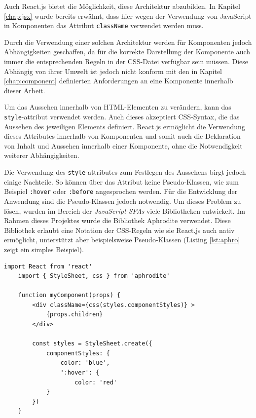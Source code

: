 Auch React.js bietet die Möglichkeit, diese Architektur abzubilden. In Kapitel \ref{chap:jsx} wurde bereits erwähnt, dass hier wegen der Verwendung von JavaScript in Komponenten das Attribut \texttt{className} verwendet werden muss.

Durch die Verwendung einer solchen Architektur werden für Komponenten jedoch Abhängigkeiten geschaffen, da für die korrekte Darstellung der Komponente auch immer die entsprechenden Regeln in der CSS-Datei verfügbar sein müssen.
Diese Abhängig von ihrer Umwelt ist jedoch nicht konform mit den in Kapitel \ref{chap:component} definierten Anforderungen an eine Komponente innerhalb dieser Arbeit.

Um das Aussehen innerhalb von HTML-Elementen zu verändern, kann das \texttt{style}-attribut verwendet werden. Auch dieses akzeptiert CSS-Syntax, die das Aussehen des jeweiligen Elements definiert.
React.js ermöglicht die Verwendung dieses Attributes innerhalb von Komponenten und somit auch die Deklaration von Inhalt und Aussehen innerhalb einer Komponente, ohne die Notwendigkeit weiterer Abhängigkeiten.

Die Verwendung des \texttt{style}-attributes zum Festlegen des Aussehens birgt jedoch einige Nachteile. So können über das Attribut keine Pseudo-Klassen, wie zum Beispiel \texttt{:hover} oder \texttt{:before} angesprochen werden. \cite{w3c2017styles}
Für die Entwicklung der Anwendung sind die Pseudo-Klassen jedoch notwendig.
Um dieses Problem zu lösen, wurden im Bereich der \textit{JavaScript-SPAs} viele Bibliotheken entwickelt. Im Rahmen dieses Projektes wurde die Bibliothek Aphrodite\footnotemark{} verwendet.
Diese Bibliothek erlaubt eine Notation der CSS-Regeln wie sie React.js auch nativ ermöglicht, unterstützt aber beispielsweise Pseudo-Klassen (Listing \ref{lst:aphro} zeigt ein simples Beispiel).


\begin{lstlisting}[caption=Beipspielhafte Verwendung der Bibliothek Aphrodite, label=lst:aphro]
	import React from 'react'
	import { StyleSheet, css } from 'aphrodite'

	function myComponent(props) {
		<div className={css(styles.componentStyles)} >
			{props.children}
		</div>

		const styles = StyleSheet.create({
			componentStyles: {
				color: 'blue',
				':hover': {
					color: 'red'
			}
		})
	}
\end{lstlisting}

